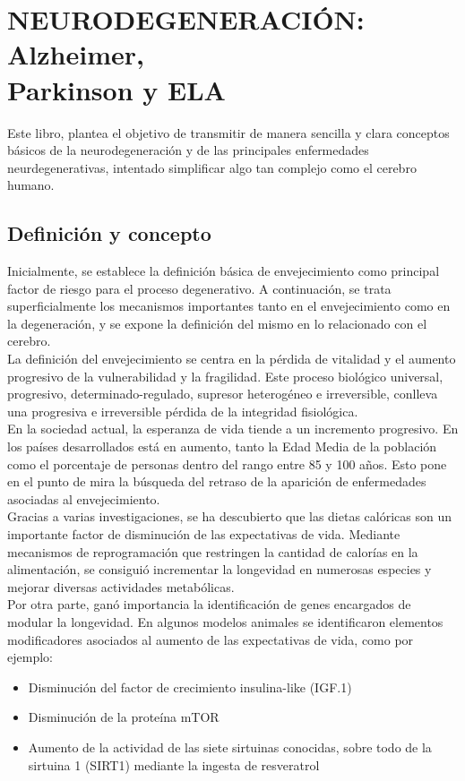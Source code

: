 \documentclass[12pt]{article}
\begin{document}
\section{NEURODEGENERACIÓN: Alzheimer,\\Parkinson y ELA}
	
	Este libro, plantea el objetivo de transmitir de manera sencilla y clara conceptos básicos de la neurodegeneración y de las principales enfermedades neurdegenerativas, intentado simplificar algo tan complejo como el cerebro humano. 
	
	\subsection{Definición y concepto}
	
	Inicialmente, se establece la definición básica de envejecimiento como principal factor de riesgo para el proceso degenerativo. A continuación, se trata superficialmente los mecanismos importantes tanto en el envejecimiento como en la degeneración, y se expone la definición del mismo en lo relacionado con el cerebro.\\
	
	La definición del envejecimiento se centra en la pérdida de vitalidad y el aumento progresivo de la vulnerabilidad y la fragilidad.  Este proceso biológico universal, progresivo, determinado-regulado, supresor heterogéneo e irreversible, conlleva una progresiva e irreversible pérdida de la integridad fisiológica.\\
	
	En la sociedad actual, la esperanza de vida tiende a un incremento progresivo. En los países desarrollados está en aumento, tanto la Edad Media de la población como el porcentaje de personas dentro del rango entre 85 y 100 años. Esto pone en el punto de mira la búsqueda del retraso de la aparición de enfermedades asociadas al envejecimiento.\\
	
	Gracias a varias investigaciones, se ha descubierto que las dietas calóricas son un importante factor de disminución de las expectativas de vida. Mediante mecanismos de reprogramación que restringen la cantidad de calorías en la alimentación, se consiguió incrementar la longevidad en numerosas especies y mejorar diversas actividades metabólicas. \\

	Por otra parte, ganó importancia la identificación de genes encargados de modular la longevidad. En algunos modelos animales se identificaron elementos modificadores asociados al aumento de las expectativas de vida, como por ejemplo:
	\begin{itemize}
		\item Disminución del factor de crecimiento insulina-like (IGF.1)
		\item Disminución de la proteína mTOR
		\item Aumento de la actividad de las siete sirtuinas conocidas, sobre todo de la sirtuina 1 (SIRT1) mediante la ingesta de resveratrol
	\end{itemize}
	
\end{document}

